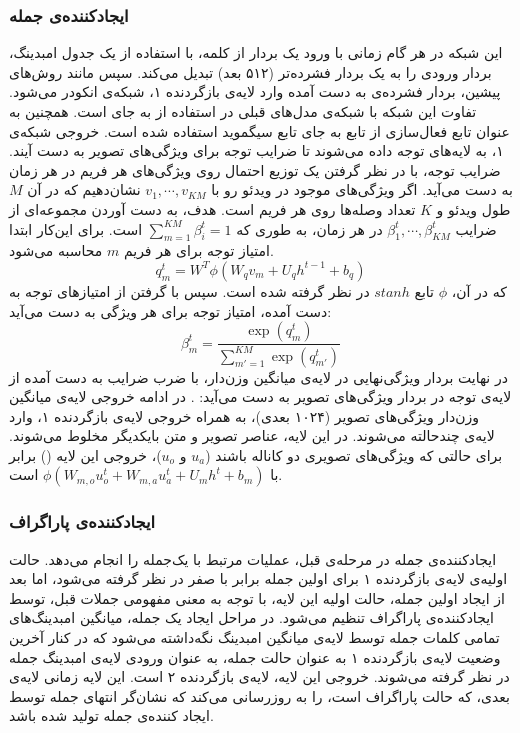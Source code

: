 \subsubsection{ایجاد‌کننده‌ی جمله}
این شبکه در هر گام زمانی با ورود یک بردار  از کلمه‌، با استفاده از یک جدول امبدینگ، بردار ورودی را به یک بردار فشرده‌تر (۵۱۲ بعد) تبدیل می‌کند. سپس مانند روش‌های پیشین، بردار فشرده‌ی به دست آمده وارد لایه‌ی بازگردنده ۱، شبکه‌ی انکودر می‌شود. تفاوت این شبکه با شبکه‌ی مدل‌های قبلی در استفاده از  به جای  است. همچنین به عنوان تابع فعال‌سازی از تابع   به جای تابع سیگموید استفاده شده است. خروجی شبکه‌ی ۱، به لایه‌های توجه   داده می‌شوند تا ضرایب توجه برای ویژگی‌های تصویر به دست آیند. ضرایب توجه، با در نظر گرفتن یک توزیع احتمال روی ویژگی‌های هر فریم در هر زمان به دست می‌آید. اگر ویژگی‌های موجود در ویدئو رو با 
$v_1, \cdots, v_{KM}$
نشان‌دهیم که در آن $M$ طول ویدئو و $K$ تعداد وصله‌ها  روی هر فریم است. هدف، به دست آوردن مجموعه‌ای از ضرایب 
$\beta^t_1, \cdots, \beta^t_{KM}$
در هر زمان، به طوری که 
$\sum_{m=1}^{KM} \beta_i^t = 1$
است. برای این‌کار ابتدا امتیاز توجه برای هر فریم $m$ محاسبه‌ می‌شود.
\begin{equation*}
	q_m^t = W^T \phi(W_qv_m +‌U_qh^{t-1} + b_q)
\end{equation*}
که در آن، $\phi$ تابع $stanh$ در نظر گرفته شده است. سپس با گرفتن  از امتیاز‌های توجه به دست آمده، امتیاز توجه برای هر ویژگی به دست می‌آید:
\begin{equation*}
		\beta^t_m = \frac{\exp(q_m^t)}{\sum_{m'=1}^{KM} \exp(q^t_{m'})}
\end{equation*}
در نهایت بردار ویژگی‌نهایی در لایه‌ی میانگین وزن‌دار، با ضرب ضرایب به دست آمده از لایه‌ی توجه در بردار ویژگی‌های تصویر به دست می‌آید: 
.
در ادامه خروجی لایه‌ی میانگین وزن‌دار ویژگی‌های تصویر (۱۰۲۴ بعدی)، به همراه خروجی لایه‌ی بازگردنده ۱، وارد لایه‌ی چند‌حالته می‌شوند. در این لایه، عناصر تصویر و متن بایکدیگر مخلوط می‌شوند. برای حالتی که ویژگی‌های تصویری دو کاناله باشند ($u_a$ و $u_o$)، خروجی این لایه () برابر با
$\phi(W_{m,o}u_o^t +‌W_{m,a}u_a^t +‌U_mh^t+b_m)$
 است.
\subsubsection{ایجاد‌کننده‌ی پاراگراف}
ایجاد‌کننده‌ی جمله در مرحله‌ی قبل، عملیات مرتبط با یک‌جمله را انجام می‌دهد. حالت اولیه‌ی لایه‌ی بازگردنده ۱ برای اولین جمله برابر با صفر در نظر گرفته می‌شود، اما بعد از ایجاد اولین جمله، حالت اولیه این لایه، با توجه به معنی مفهومی جملات قبل، توسط ایجاد‌کننده‌ی پاراگراف تنظیم می‌شود. در مراحل ایجاد یک جمله، میانگین امبدینگ‌های تمامی کلمات جمله توسط لایه‌ی میانگین امبدینگ 
نگه‌داشته می‌شود که در کنار آخرین وضعیت لایه‌ی بازگردنده ۱ به عنوان حالت جمله، به عنوان ورودی لایه‌ی امبدینگ جمله 
در نظر گرفته می‌شوند. خروجی این لایه‌، لایه‌ی بازگردنده ۲ است. این لایه زمانی لایه‌ی بعدی، که حالت پاراگراف است، را به روز‌رسانی می‌کند که نشان‌گر انتهای جمله 
توسط ایجاد کنند‌ه‌ی جمله تولید شده باشد.
